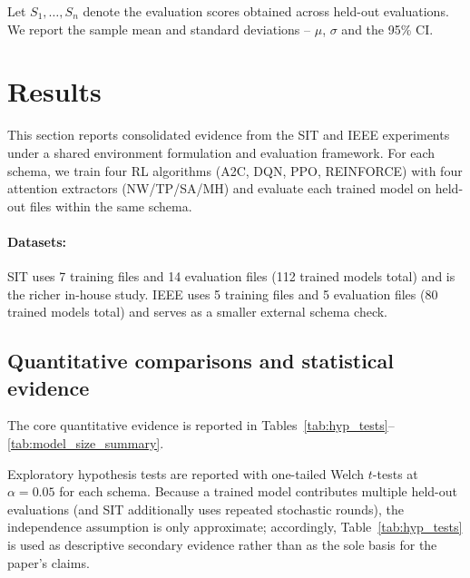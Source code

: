 \documentclass[sn-basic]{sn-jnl} %
\begin{document}
Let $S_1,\ldots,S_n$ denote the evaluation scores obtained across held-out evaluations. We report the sample mean and standard deviations -- $\mu$, $\sigma$ and the 95\% CI.

\section{Results} \label{sec:results}
This section reports consolidated evidence from the SIT and IEEE experiments under a shared environment formulation and evaluation framework. For each schema, we train four RL algorithms (\textsc{A2C}, \textsc{DQN}, \textsc{PPO}, \textsc{REINFORCE}) with four attention extractors (NW/TP/SA/MH) and evaluate each trained model on held-out files within the same schema.

\paragraph{Datasets:}
SIT uses 7 training files and 14 evaluation files (112 trained models total) and is the richer in-house study. IEEE uses 5 training files and 5 evaluation files (80 trained models total) and serves as a smaller external schema check.

\subsection{Quantitative comparisons and statistical evidence}
\label{sec:hypothesis_tests}

The core quantitative evidence is reported in Tables~\ref{tab:hyp_tests}--\ref{tab:model_size_summary}.

Exploratory hypothesis tests are reported with one-tailed Welch $t$-tests at $\alpha=0.05$ for each schema. Because a trained model contributes multiple held-out evaluations (and SIT additionally uses repeated stochastic rounds), the independence assumption is only approximate; accordingly, Table~\ref{tab:hyp_tests} is used as descriptive secondary evidence rather than as the sole basis for the paper's claims.
\end{document}
